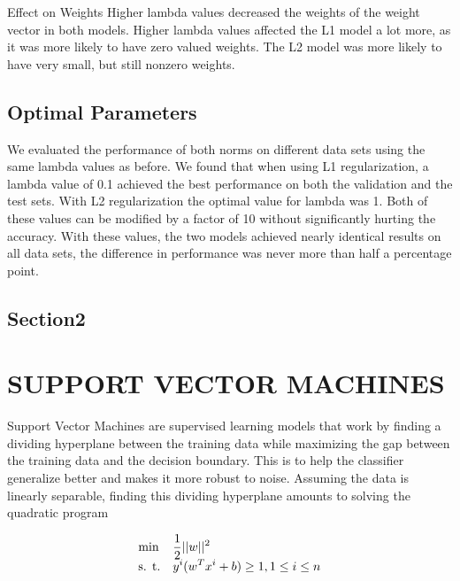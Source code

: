 \documentclass[10pt,twoside]{article}
\begin{document}
Effect on Weights
Higher lambda values decreased the weights of the weight vector in both models. Higher lambda values affected the L1 model a lot more, as it was more likely to have zero valued weights. The L2 model was more likely to have very small, but still nonzero weights. 

\subsection{Optimal Parameters}
We evaluated the performance of both norms on different data sets using the same lambda values as before. We found that when using L1 regularization, a lambda value of 0.1 achieved the best performance on both the validation and the test sets. With L2 regularization the optimal value for lambda was 1. Both of these values can be modified by a factor of 10 without significantly hurting the accuracy. With these values, the two models achieved nearly identical results on all data sets, the difference in performance was never more than half a percentage point.

\subsection{Section2}




\section{\uppercase{Support Vector Machines}}

Support Vector Machines are supervised learning models that work by finding a dividing hyperplane between the training data while maximizing the gap between the training data and the decision boundary. This is to help the classifier generalize better and makes it more robust to noise. Assuming the data is linearly separable, finding this dividing hyperplane amounts to solving the quadratic program

\begin{equation}
\begin{array}{ll@{}ll}
\text{min}  & \displaystyle \frac{1}{2} ||w||^2 &\\
\text{s. t.}& \displaystyle y^i(w^T x^i + b) \geq 1 , 1 \leq i \leq n
\end{array}
\end{equation}
\end{document}
